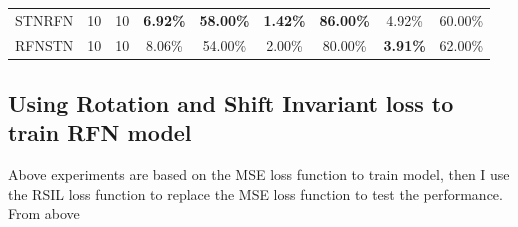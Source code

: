 \begin{table}[h]
\begin{tabular}{ccccccccc}
    STNRFN & 10  &10  & \textbf{6.92\%} & \textbf{58.00\%}                                                                         & \textbf{1.42\%} & \textbf{86.00\%}                                                                         & 4.92\%          & 60.00\%                                                                                  \\
    RFNSTN & 10 &10   & 8.06\%          & 54.00\%                                                                                  & 2.00\%          & 80.00\%                                                                                  & \textbf{3.91\%} & 62.00\%                                                                                  \\ \hline
    \end{tabular}
    \label{stn}
\end{table}

\subsection{Using Rotation and Shift Invariant loss to train RFN model}
Above experiments are based on the MSE loss function to train model, then I use the RSIL loss function to replace the MSE loss function to test the performance. From above 

